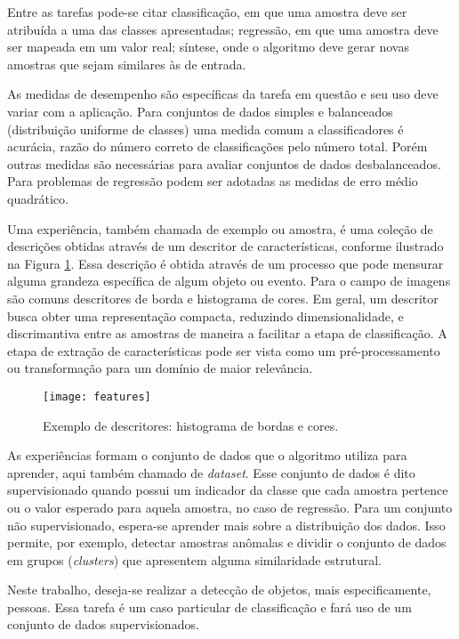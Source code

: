 Entre as tarefas pode-se citar classificação, em que uma amostra deve ser atribuída a uma das classes apresentadas; regressão, em que uma amostra deve ser mapeada em um valor real; síntese, onde o algoritmo deve gerar novas amostras que sejam similares às de entrada.

As medidas de desempenho são específicas da tarefa em questão e seu uso deve variar com a aplicação. Para conjuntos de dados simples e balanceados (distribuição uniforme de classes) uma medida comum a classificadores é acurácia, razão do número correto de classificações pelo número total. Porém outras medidas são necessárias para avaliar conjuntos de dados desbalanceados. Para problemas de regressão podem ser adotadas as medidas de erro médio quadrático.

Uma experiência, também chamada de exemplo ou amostra, é uma coleção de descrições obtidas através de um descritor de características, conforme ilustrado na Figura \ref{fig:features}. Essa descrição é obtida através de um processo que pode mensurar alguma grandeza específica de algum objeto ou evento. Para o campo de imagens são comuns descritores de borda e histograma de cores. Em geral, um descritor busca obter uma representação compacta, reduzindo dimensionalidade, e discrimantiva entre as amostras de maneira a facilitar a etapa de classificação. A etapa de extração de características pode ser vista como um pré-processamento ou transformação para um domínio de maior relevância.

\begin{figure}[h]
\centering
\texttt{[image: features]}
\caption{Exemplo de descritores: histograma de bordas e cores.}
\label{fig:features}
\end{figure}

As experiências formam o conjunto de dados que o algoritmo utiliza para aprender, aqui também chamado de \textit{dataset}. Esse conjunto de dados é dito supervisionado quando possui um indicador da classe que cada amostra pertence ou o valor esperado para aquela amostra, no caso de regressão. Para um conjunto não supervisionado, espera-se aprender mais sobre a distribuição dos dados. Isso permite, por exemplo, detectar amostras anômalas e dividir o conjunto de dados em grupos (\textit{clusters}) que apresentem alguma similaridade estrutural.

Neste trabalho, deseja-se realizar a detecção de objetos, mais especificamente, pessoas. Essa tarefa é um caso particular de classificação e fará uso de um conjunto de dados supervisionados.


